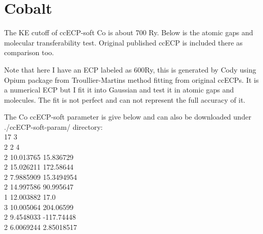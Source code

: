 \section{Cobalt}

 The KE cutoff of ccECP-soft Co is about 700 Ry. Below is the atomic gaps and molecular transferability test. Original published ccECP is included there as comparison too.

Note that here I have an ECP labeled as 600Ry, this is generated by Cody using Opium package from Troullier-Martins method fitting from original ccECPs. It is a numerical ECP but I fit it into Gaussian and test it in atomic gaps and molecules. The fit is not perfect and can not represent the full accuracy of it.

The Co ccECP-soft parameter is give below and can also be downloaded under ./ccECP-soft-param/ directory:\\
17 3  \\
2 2 4 \\
2 10.013765  15.836729    \\ 
2 15.026211  172.58644    \\
2 7.9885909 15.3494954    \\
2 14.997586  90.995647    \\
1 12.003882  17.0    \\
3 10.005064  204.06599    \\
2 9.4548033 -117.74448    \\
2 6.0069244 2.85018517    \\


